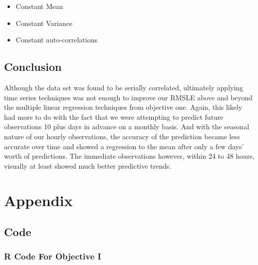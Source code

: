 \documentclass[american,]{article}
\providecommand{\tightlist}{%
  \setlength{\itemsep}{0pt}\setlength{\parskip}{0pt}}
\begin{document}
\begin{itemize}
\tightlist
\item
  Constant Mean
\item
  Constant Variance
\item
  Constant auto-correlations
\end{itemize}

\hypertarget{conclusion-1}{%
\subsection{Conclusion}\label{conclusion-1}}

Although the data set was found to be serially correlated, ultimately applying time series techniques was not enough to improve our RMSLE above and beyond the multiple linear regression techniques from objective one. Again, this likely had more to do with the fact that we were attempting to predict future observations 10 plus days in advance on a monthly basis. And with the seasonal nature of our hourly observations, the accuracy of the prediction became less accurate over time and showed a regression to the mean after only a few days' worth of predictions. The immediate observations however, within 24 to 48 hours, visually at least showed much better predictive trends.

\newpage

\hypertarget{appendix}{%
\section{Appendix}\label{appendix}}

\hypertarget{code}{%
\subsection{Code}\label{code}}

\hypertarget{r-code-for-objective-i}{%
\subsubsection{R Code For Objective I}\label{r-code-for-objective-i}}
\end{document}
